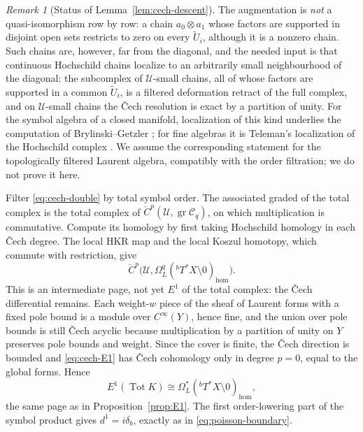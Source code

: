 \documentclass[11pt,oneside,reqno]{article}
\DeclareMathOperator{\gr}{gr}
\newcommand{\Tbstar}{{}^{b}T^*X}
\theoremstyle{plain}
\theoremstyle{definition}
\theoremstyle{remark}
\newtheorem{remark}[theorem]{Remark}
\begin{document}
\begin{remark}[Status of Lemma~\ref{lem:cech-descent}]
The augmentation is \emph{not} a quasi-isomorphism row by row: a chain
\(a_0\otimes a_1\) whose factors are supported in disjoint open sets
restricts to zero on every \(\widetilde U_i\), although it is a nonzero
chain. Such chains are, however, far from the diagonal, and the needed
input is that continuous Hochschild chains localize to an arbitrarily small
neighbourhood of the diagonal: the subcomplex of \(\mathcal U\)-small
chains, all of whose factors are supported in a common \(\widetilde U_i\),
is a filtered deformation retract of the full complex, and on
\(\mathcal U\)-small chains the \v Cech resolution is exact by a partition
of unity. For the symbol algebra of a closed manifold, localization of
this kind underlies the computation of Brylinski--Getzler \cite{BG}; for
fine algebras it is
Teleman's localization of the Hochschild complex \cite{Teleman}. We assume
the corresponding statement for the topologically filtered Laurent algebra,
compatibly with the order filtration; we do not prove it here.
\end{remark}

Filter \eqref{eq:cech-double} by total symbol order. The associated graded
of the total complex is the total complex of
\(\check C^p(\mathcal U,\gr\mathcal C_q)\), on which multiplication is
commutative. Compute its homology by first taking Hochschild homology
in each \v Cech degree. The local HKR map and the local Koszul homotopy,
which commute with restriction, give
\begin{equation}\label{eq:cech-E1}
 \check C^p\bigl(\mathcal U,
 \Omega_L^q(\Tbstar\setminus0)_{\mathrm{hom}}\bigr).
\end{equation}
This is an intermediate page, not yet \(E^1\) of the total complex: the
\v Cech differential remains. Each weight-\(w\) piece of the sheaf of
Laurent forms with a fixed pole bound is a module over \(C^\infty(Y)\),
hence fine, and the union over pole bounds is still \v Cech acyclic because
multiplication by a partition of unity on \(Y\) preserves pole bounds and
weight. Since the cover is finite, the \v Cech direction is bounded and
\eqref{eq:cech-E1} has \v Cech cohomology only in degree \(p=0\), equal to
the global forms. Hence
\[
 E^1(\operatorname{Tot}K)\cong\Omega_L^*(\Tbstar\setminus0)_{\mathrm{hom}},
\]
the same page as in Proposition~\ref{prop:E1}. The first order-lowering part
of the symbol product gives \(d^1=i\delta_b\), exactly as in
\eqref{eq:poisson-boundary}.
\end{document}
